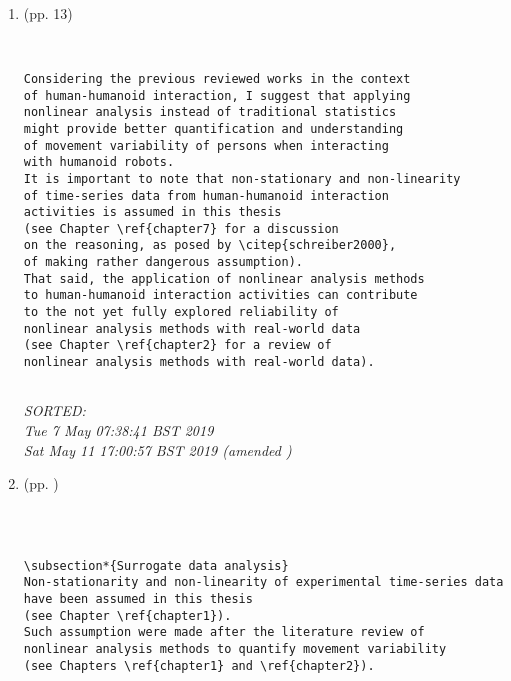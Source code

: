 \documentclass[12pt]{article}
\begin{document}
\begin{enumerate}

\item  (pp. 13)   

	\begin{verbatim}


Considering the previous reviewed works in the context 
of human-humanoid interaction, I suggest that applying 
nonlinear analysis instead of traditional statistics 
might provide better quantification and understanding
of movement variability of persons when interacting 
with humanoid robots.
It is important to note that non-stationary and non-linearity 
of time-series data from human-humanoid interaction
activities is assumed in this thesis  
(see Chapter \ref{chapter7} for a discussion
on the reasoning, as posed by \citep{schreiber2000},
of making rather dangerous assumption).
That said, the application of nonlinear analysis methods 
to human-humanoid interaction activities can contribute 
to the not yet fully explored reliability of 
nonlinear analysis methods with real-world data 
(see Chapter \ref{chapter2} for a review of 
nonlinear analysis methods with real-world data).


	\end{verbatim}
	\textit{
	SORTED: \\ 
	Tue  7 May 07:38:41 BST 2019 \\
	Sat May 11 17:00:57 BST 2019 (amended )
	}
	\\


\item  (pp. )   

	\begin{verbatim}
	


\subsection*{Surrogate data analysis}
Non-stationarity and non-linearity of experimental time-series data 
have been assumed in this thesis 
(see Chapter \ref{chapter1}).
Such assumption were made after the literature review of 
nonlinear analysis methods to quantify movement variability
(see Chapters \ref{chapter1} and \ref{chapter2}). 


\end{verbatim}
\end{enumerate}
\end{document}
